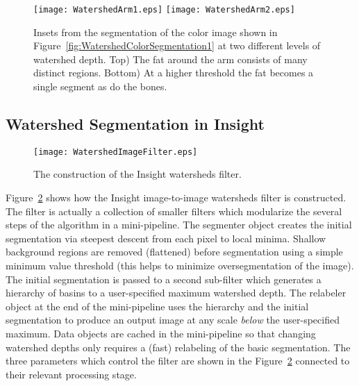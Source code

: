 \begin{figure}
\centering
\texttt{[image: WatershedArm1.eps]}
\texttt{[image: WatershedArm2.eps]}
\caption{
Insets from the segmentation of the color image shown in 
Figure~\protect\ref{fig:WatershedColorSegmentation1} at two different levels of 
watershed depth.  Top) The fat around the arm consists of many 
distinct regions.  Bottom) At a higher threshold the 
fat becomes a single segment as do the bones.
}
\protect\label{fig:WatershedColorSegmentation3}
\end{figure}
\subsection{Watershed Segmentation in Insight}
\label{sec:ImplementationWatersheds}

\begin{figure}
\centering
\texttt{[image: WatershedImageFilter.eps]}
\caption{The construction of the Insight watersheds filter.}
\protect\label{fig:constructionWatersheds}
\end{figure}

Figure~\ref{fig:constructionWatersheds} shows how the Insight image-to-image
watersheds filter is constructed.  The filter is actually a collection of
smaller filters which modularize the several steps of the algorithm in a
mini-pipeline.  The segmenter object creates the initial segmentation via
steepest descent from each pixel to local minima. Shallow background regions
are removed (flattened) before segmentation using a simple minimum value
threshold (this helps to minimize oversegmentation of the image).  The initial
segmentation is passed to a second sub-filter which generates a hierarchy of
basins to a user-specified maximum watershed depth.  The relabeler object at
the end of the mini-pipeline uses the hierarchy and the initial segmentation to
produce an output image at any scale {\em below} the user-specified maximum.
Data objects are cached in the mini-pipeline so that changing watershed depths
only requires a (fast) relabeling of the basic segmentation.  The three
parameters which control the filter are shown in the
Figure~\ref{fig:constructionWatersheds} connected to their relevant processing
stage.


